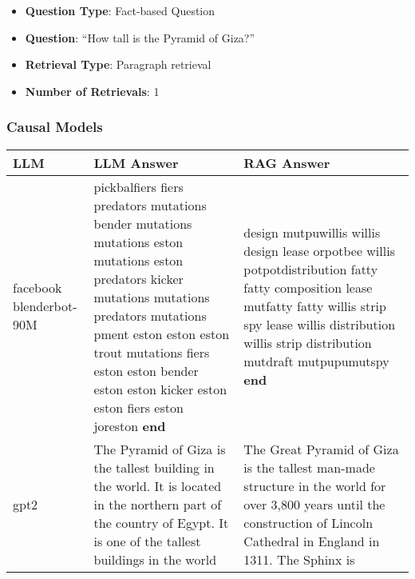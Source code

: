 \documentclass[11pt]{wseas}
\begin{document}
\begin{itemize}
\tightlist
\item
  \textbf{Question Type}: Fact-based Question
\item
  \textbf{Question}: ``How tall is the Pyramid of Giza?''
\item
  \textbf{Retrieval Type}: Paragraph retrieval
\item
  \textbf{Number of Retrievals}: 1
\end{itemize}

\subsubsection{Causal Models}\label{causal-models}

\begin{longtable}[]{@{}
  >{\raggedright\arraybackslash}p{}
  >{\raggedright\arraybackslash}p{}
  >{\raggedright\arraybackslash}p{}@{}}
\toprule\noalign{}
\begin{minipage}[b]{\linewidth}\raggedright
LLM
\end{minipage} & \begin{minipage}[b]{\linewidth}\raggedright
LLM Answer
\end{minipage} & \begin{minipage}[b]{\linewidth}\raggedright
RAG Answer
\end{minipage} \\
\midrule\noalign{}
\endhead
\bottomrule\noalign{}
\endlastfoot
facebook blenderbot-90M & pickbalfiers fiers predators mutations bender
mutations mutations eston mutations eston predators kicker mutations
mutations predators mutations pment eston eston eston trout mutations
fiers eston eston bender eston eston kicker eston eston fiers eston
joreston \textbf{end} & design mutpuwillis willis design lease orpotbee
willis potpotdistribution fatty fatty composition lease mutfatty fatty
willis strip spy lease willis distribution willis strip distribution
mutdraft mutpupumutspy \textbf{end} \\
gpt2 & The Pyramid of Giza is the tallest building in the world. It is
located in the northern part of the country of Egypt. It is one of the
tallest buildings in the world & The Great Pyramid of Giza is the
tallest man-made structure in the world for over 3,800 years until the
construction of Lincoln Cathedral in England in 1311. The Sphinx is \\

\end{longtable}
\end{document}
